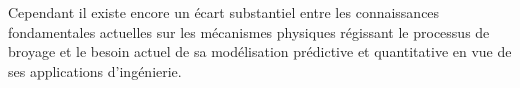 Cependant il existe encore un écart substantiel entre les connaissances fondamentales actuelles sur les mécanismes physiques régissant le processus de broyage et le besoin actuel de sa modélisation prédictive et quantitative en vue de ses applications d'ingénierie.

